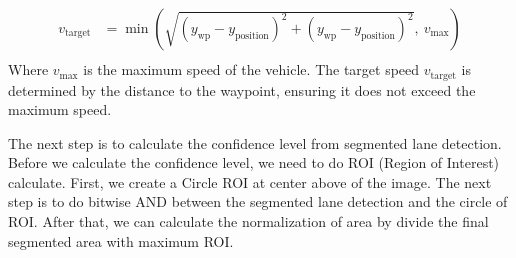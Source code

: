 \documentclass[conference]{IEEEtran}
\begin{document}
\begin{equation}
	\begin{aligned}
		v_{\text{target}} &= \min\left(\sqrt{(y_{\text{wp}} - y_{\text{position}})^2 + (y_{\text{wp}} - y_{\text{position}})^2}, \ v_{\text{max}}\right) \\
		\label{eq:bicycle_model_velocity}
	\end{aligned}		
\end{equation}
Where $v_{\text{max}}$ is the maximum speed of the vehicle. The target speed $v_{\text{target}}$ is determined by the distance to the waypoint, ensuring it does not exceed the maximum speed.

\par    
The next step is to calculate the confidence level from segmented lane detection. Before we calculate the confidence level, we need to do ROI (Region of Interest) calculate. First, we create a Circle ROI at center above of the image. The next step is to do bitwise AND between the segmented lane detection and the circle of ROI. After that, we can calculate the normalization of area by divide the final segmented area with maximum ROI. 
\end{document}
